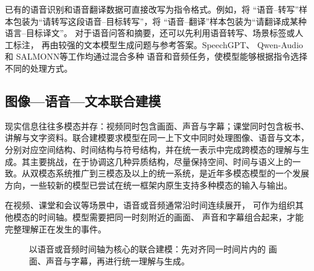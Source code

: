 已有的语音识别和语音翻译数据可直接改写为指令格式。例如，将
“语音--转写”样本包装为“请转写这段语音--目标转写”，将
“语音--翻译”样本包装为“请翻译成某种语言--目标译文”。
对于语音问答和摘要，还可以先利用语音转写、场景标签或人工标注，
再由较强的文本模型生成问题与参考答案。SpeechGPT\cite{speechgpt}、
Qwen-Audio\cite{qwenaudio}和 SALMONN\cite{salmonn}等工作均通过混合多种
语音和音频任务，使模型能够根据指令选择不同的处理方式。


\subsection{图像—语音—文本联合建模}
\label{sub:joint}

现实信息往往多模态并存：视频同时包含画面、声音与字幕；课堂同时包含板书、讲解与文字资料。联合建模要求模型在同一上下文中同时处理图像、语音与文本，分别对应空间结构、时间结构与符号结构，并在统一表示中完成跨模态的理解与生成。其主要挑战，在于协调这几种异质结构，尽量保持空间、时间与语义上的一致。从双模态系统推广到三模态及以上的统一系统，是近年多模态模型的一个发展方向，一些较新的模型已尝试在统一框架内原生支持多种模态的输入与输出。


在视频、课堂和会议等场景中，语音或音频通常沿时间连续展开，
可作为组织其他模态的时间轴。模型需要把同一时刻附近的画面、
声音和字幕组合起来，才能完整理解正在发生的事件。

\begin{figure}[htbp]
  \centering

  \caption{以语音或音频时间轴为核心的联合建模：先对齐同一时间片内的
  画面、声音与字幕，再进行统一理解与生成。}
  \label{fig:audio-centered-joint}
\end{figure}

